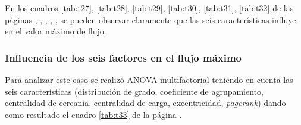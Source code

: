 \documentclass{article}
\begin{document}
En los cuadros \ref{tab:t27}, \ref{tab:t28}, \ref{tab:t29}, \ref{tab:t30}, \ref{tab:t31}, \ref{tab:t32} de las páginas \pageref{tab:t27}, \pageref{tab:t28}, \pageref{tab:t29}, \pageref{tab:t30}, \pageref{tab:t31}, \pageref{tab:t32}   se pueden observar claramente que las seis características influye en el valor máximo de flujo.

\subsubsection{Influencia de los seis factores en el flujo máximo}
Para analizar este caso se realizó ANOVA multifactorial teniendo en cuenta las seis características (distribución de grado, coeficiente de agrupamiento, centralidad de cercanía, centralidad de carga, excentricidad, \textit{pagerank}) dando como resultado el cuadro \ref{tab:t33} de la página \pageref{tab:t33}.
\end{document}
